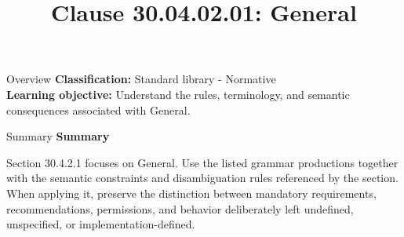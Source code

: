 \documentclass[10pt,letterpaper]{article}
\title{Clause 30.04.02.01: General}
\author{}
\date{}
\begin{document}
\maketitle
\begin{CornellOverviewBox}{Overview}
\textbf{Classification:} Standard library - Normative\\[2pt]
\textbf{Learning objective:} Understand the rules, terminology, and semantic consequences associated with General.
\end{CornellOverviewBox}\begin{CornellSummaryBox}{Summary}
{\sffamily\bfseries\color{Accent} Summary}\par\vspace{3pt}Section 30.4.2.1 focuses on General. Use the listed grammar productions together with the semantic constraints and disambiguation rules referenced by the section. When applying it, preserve the distinction between mandatory requirements, recommendations, permissions, and behavior deliberately left undefined, unspecified, or implementation-defined.
\end{CornellSummaryBox}
\end{document}
